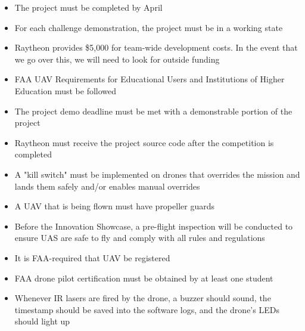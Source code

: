 
\begin{itemize}
    \item The project must be completed by April
    \item For each challenge demonstration, the project must be in a working state
    \item Raytheon provides \$5,000 for team-wide development costs. In the event that we go over this, we will need to look for outside funding
    \item FAA UAV Requirements for Educational Users and Institutions of Higher Education must be followed
    \item The project demo deadline must be met with a demonstrable portion of the project
    \item Raytheon must receive the project source code after the competition is completed
    \item A "kill switch" must be implemented on drones that overrides the mission and lands them safely and/or enables manual overrides
    \item A UAV that is being flown must have propeller guards
    \item Before the Innovation Showcase, a pre-flight inspection will be conducted to ensure UAS are safe to fly and comply with all rules and regulations
    \item It is FAA-required that UAV be registered
    \item FAA drone pilot certification must be obtained by at least one student
    \item Whenever IR lasers are fired by the drone, a buzzer should sound, the timestamp should be saved into the software logs, and the drone's LEDs should light up
\end{itemize}

\newpage
